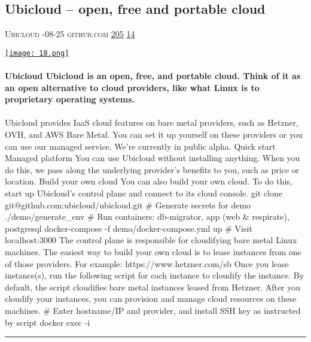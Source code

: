 \documentclass[10pt,a4paper]{article}
\begin{document}
\begin{multicols*}{2}
\begin{minipage}{\linewidth}
\subsection{Ubicloud – open, free and portable cloud}
\textsc{\footnotesize
{\scriptsize\faUser}\space 
Ubicloud 
{\scriptsize\faCalendar}-08-25 
{\scriptsize\faGithub}\space 
github.com 
{\scriptsize\faThumbsOUp}\space 
\href{http://news.ycombinator.com/item?id=37154138\&utm\_term=comment}{205} 
{\scriptsize\faComments}\space 
\href{http://news.ycombinator.com/item?id=37154138\&utm\_term=comment}{14} 
}
\par\medskip\noindent
\href{https://github.com/ubicloud/ubicloud?utm\_source=hackernewsletter\&utm\_medium=email\&utm\_term=show\_hn}{
    \texttt{[image: 18.png]}
}
\end{minipage}
\paragraph{}
\textbf{Ubicloud
Ubicloud is an open, free, and portable cloud. Think of it as an open alternative to cloud providers, like what Linux is to proprietary operating systems.}
\paragraph{}

Ubicloud provides IaaS cloud features on bare metal providers, such as Hetzner, OVH, and AWS Bare Metal. You can set it up yourself on these providers or you can use our managed service. We're currently in public alpha.
Quick start
Managed platform
You can use Ubicloud without installing anything. When you do this, we pass along the underlying provider's benefits to you, such as price or location.
Build your own cloud
You can also build your own cloud. To do this, start up Ubicloud's control plane and connect to its cloud console.
git clone git@github.com:ubicloud/ubicloud.git \# Generate secrets for demo ./demo/generate\_env \# Run containers: db-migrator, app (web \& respirate), postgresql docker-compose -f demo/docker-compose.yml up \# Visit localhost:3000
The control plane is responsible for cloudifying bare metal Linux machines. The easiest way to build your own cloud is to lease instances from one of those providers. For example: https://www.hetzner.com/sb
Once you lease instance(s), run the following script for each instance to cloudify the instance. By default, the script cloudifies bare metal instances leased from Hetzner. After you cloudify your instances, you can provision and manage cloud resources on these machines.
\# Enter hostname/IP and provider, and install SSH key as instructed by script docker exec -i
\par\noindent\textcolor{red}{\rule{\linewidth}{0.2mm}}
\vfill
\null
\noindent\begin{minipage}{\linewidth}

\end{minipage}
\end{multicols*}
\end{document}
